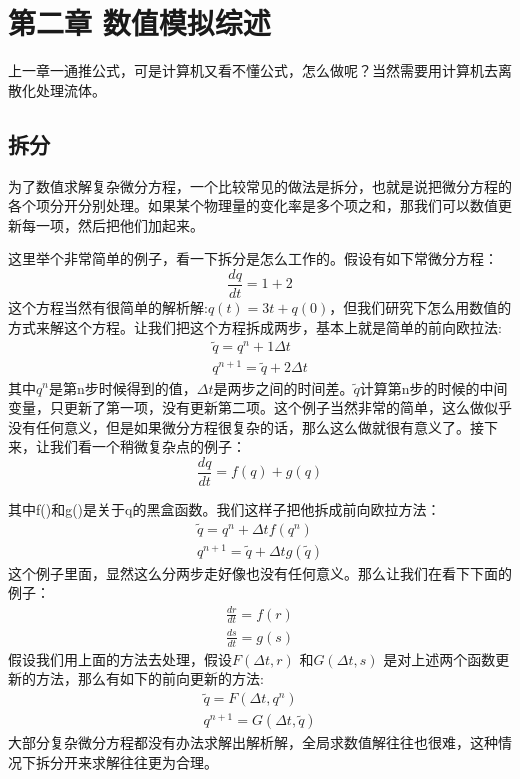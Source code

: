 \documentclass{article}
\begin{document}
\section{第二章 数值模拟综述}
上一章一通推公式，可是计算机又看不懂公式，怎么做呢？当然需要用计算机去离散化处理流体。
\subsection{拆分}
为了数值求解复杂微分方程，一个比较常见的做法是拆分，也就是说把微分方程的各个项分开分别处理。如果某个物理量的变化率是多个项之和，那我们可以数值更新每一项，然后把他们加起来。
\par 这里举个非常简单的例子，看一下拆分是怎么工作的。假设有如下常微分方程：
\begin{equation}
\frac{dq}{dt}=1+2
\end{equation}
这个方程当然有很简单的解析解:$q(t)=3t+q(0)$，但我们研究下怎么用数值的方式来解这个方程。让我们把这个方程拆成两步，基本上就是简单的前向欧拉法:
\begin{equation}
\begin{aligned}
\tilde{q}=q^n+1\Delta{t} \\
q^{n+1}=\tilde{q}+2\Delta{t}
\end{aligned}
\end{equation}
其中$q^n$是第n步时候得到的值，$\Delta{t}$是两步之间的时间差。$\tilde{q}$计算第n步的时候的中间变量，只更新了第一项，没有更新第二项。这个例子当然非常的简单，这么做似乎没有任何意义，但是如果微分方程很复杂的话，那么这么做就很有意义了。接下来，让我们看一个稍微复杂点的例子：
\begin{equation}
\frac{dq}{dt}=f(q)+g(q)
\end{equation}
\par 其中f()和g()是关于q的黑盒函数。我们这样子把他拆成前向欧拉方法：
\begin{equation}
\begin{aligned}
\tilde{q}=q^n+\Delta{t}f(q^n) \\
q^{n+1}=\tilde{q}+\Delta{t}g(\tilde{q})
\end{aligned}
\end{equation}
这个例子里面，显然这么分两步走好像也没有任何意义。那么让我们在看下下面的例子：
\begin{equation}
\begin{aligned}
\frac{dr}{dt}=f(r) \\
\frac{ds}{dt}=g(s)
\end{aligned}
\end{equation}
假设我们用上面的方法去处理，假设$F(\Delta{t},r)$ 和$G(\Delta{t},s)$ 是对上述两个函数更新的方法，那么有如下的前向更新的方法:
\begin{equation}
\begin{aligned}
\tilde{q}=F(\Delta{t},q^n) \\
q^{n+1}=G(\Delta{t},\tilde{q})
\end{aligned}
\end{equation}
大部分复杂微分方程都没有办法求解出解析解，全局求数值解往往也很难，这种情况下拆分开来求解往往更为合理。
\end{document}
